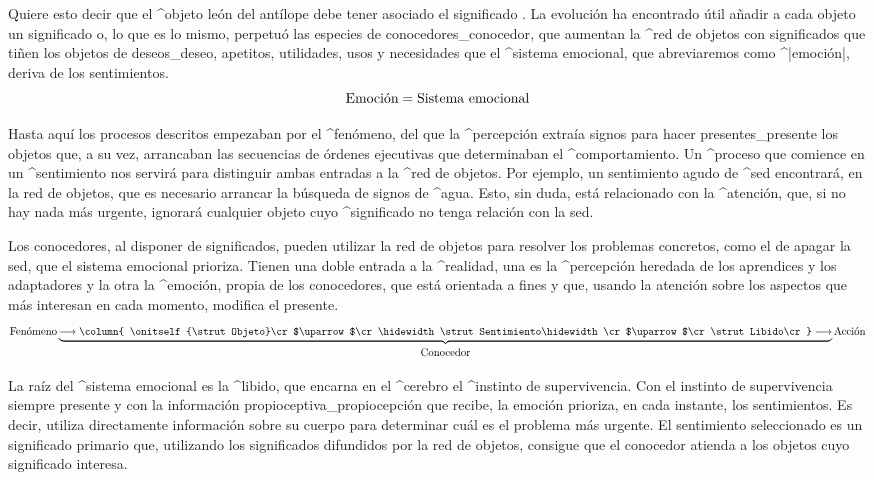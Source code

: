 Quiere esto decir que el ^{objeto} león del antílope debe tener asociado
el significado . La evolución ha encontrado útil
añadir a cada objeto un significado o, lo que es lo mismo, perpetuó las
especies de conocedores_{conocedor}, que aumentan la ^{red de objetos}
con significados que tiñen los objetos de deseos_{deseo}, apetitos,
utilidades, usos y necesidades que el ^{sistema emocional}, que
abreviaremos como ^|emoción|, deriva de los sentimientos.
$$\hbox{Emoción} = \hbox{Sistema emocional}$$

Hasta aquí los procesos descritos empezaban por el ^{fenómeno}, del que
la ^{percepción} extraía signos para hacer presentes_{presente} los
objetos que, a su vez, arrancaban las secuencias de órdenes ejecutivas
que determinaban el ^{comportamiento}. Un ^{proceso} que comience en un
^{sentimiento} nos servirá para distinguir ambas entradas a la ^{red de
objetos}. Por ejemplo, un sentimiento agudo de ^{sed} encontrará, en la
red de objetos, que es necesario arrancar la búsqueda de signos de
^{agua}. Esto, sin duda, está relacionado con la ^{atención}, que, si no
hay nada más urgente, ignorará cualquier objeto cuyo ^{significado} no
tenga relación con la sed.

Los conocedores, al disponer de significados, pueden utilizar la red de
objetos para resolver los problemas concretos, como el de apagar la sed,
que el sistema emocional prioriza. Tienen una doble entrada a la
^{realidad}, una es la ^{percepción} heredada de los aprendices y los
adaptadores y la otra la ^{emoción}, propia de los conocedores, que está
orientada a fines y que, usando la atención sobre los aspectos que más
interesan en cada momento, modifica el presente.
$$\hbox{Fenómeno}
   \underbrace{
    \longrightarrow
    \column{
     \onitself{\strut Objeto}\cr
     $\uparrow$\cr
     \hidewidth\strut Sentimiento\hidewidth\cr
     $\uparrow$\cr
     \strut Libido\cr}
    \longrightarrow}_{\strut\hbox{Conocedor}}
  \hbox{Acción}
$$

La raíz del ^{sistema emocional} es la ^{libido}, que encarna en el
^{cerebro} el ^{instinto de supervivencia}. Con el instinto de
supervivencia siempre presente y con la información
propioceptiva_{propiocepción} que recibe, la emoción prioriza, en cada
instante, los sentimientos. Es decir, utiliza directamente información
sobre su cuerpo para determinar cuál es el problema más urgente. El
sentimiento seleccionado es un significado primario que, utilizando los
significados difundidos por la red de objetos, consigue que el conocedor
atienda a los objetos cuyo significado interesa.


